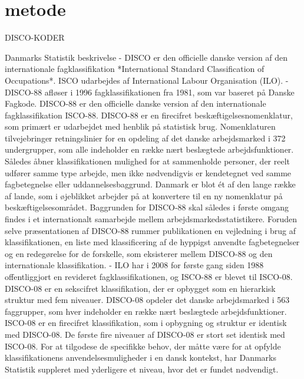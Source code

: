 
\chapter{metode} \label{metode}


DISCO-KODER

Danmarks Statistik beskrivelse
- DISCO er den officielle danske version af den internationale fagklassifikation *International Standard Classification of Occupations*. ISCO udarbejdes af International Labour Organisation (ILO).
- DISCO-88 afløser i 1996 fagklassifikationen fra 1981, som var baseret på Danske Fagkode. DISCO-88 er den officielle danske version af den internationale fagklassifikation ISCO-88. DISCO-88 er en firecifret beskæftigelsesnomenklatur, som primært er udarbejdet med henblik på statistisk brug. Nomenklaturen tilvejebringer retningslinier for en opdeling af det danske arbejdsmarked i 372 undergrupper, som alle indeholder en række nært beslægtede arbejdsfunktioner. Således åbner klassifikationen mulighed for at sammenholde personer, der reelt udfører samme type arbejde, men ikke nødvendigvis er kendetegnet ved samme fagbetegnelse eller uddannelsesbaggrund. Danmark er blot ét af den lange række af lande, som i øjeblikket arbejder på at konvertere til en ny nomenklatur på beskæftigelsesområdet. Baggrunden for DISCO-88 skal således i første omgang findes i et internationalt samarbejde mellem arbejdsmarkedsstatistikere. Foruden selve præsentationen af DISCO-88 rummer publikationen en vejledning i brug af klassifikationen, en liste med klassificering af de hyppigst anvendte fagbetegnelser og en redegørelse for de forskelle, som eksisterer mellem DISCO-88 og den internationale klassifikation.
- ILO har i 2008 for første gang siden 1988 offentliggjort en revideret fagklassifikationen, og ISCO-88 er blevet til ISCO-08. DISCO-08 er en sekscifret klassifikation, der er opbygget som en hierarkisk struktur med fem niveauer. DISCO-08 opdeler det danske arbejdsmarked i 563 faggrupper, som hver indeholder en række nært beslægtede arbejdsfunktioner. ISCO-08 er en firecifret klassifikation, som i opbygning og struktur er identisk med DISCO-08. De første fire niveauer af DISCO-08 er stort set identisk med ISCO-08. For at tilgodese de specifikke behov, der måtte være for at opfylde klassifikationens anvendelsesmuligheder i en dansk kontekst, har Danmarks Statistik suppleret med yderligere et niveau, hvor det er fundet nødvendigt. 

